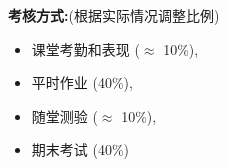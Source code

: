 \documentclass[11pt,a4paper]{article}
\begin{document}
\begin{center}

\end{center}

\vspace*{.15in}
\noindent\textbf{考核方式:}(根据实际情况调整比例) 
\begin{itemize}
	\item 课堂考勤和表现 ($\approx$ 10\%),  
	\item 平时作业 (40\%), 
	\item 随堂测验 ($\approx$ 10\%), 
	\item 期末考试 (40\%) 
\end{itemize}

\end{document}
